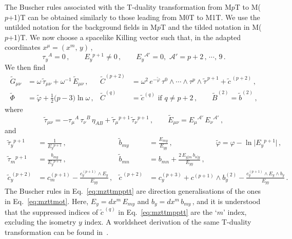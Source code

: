 \documentclass[11pt]{article}
\newcommand{\be}{\begin{equation}}
\newcommand{\ee}{\end{equation}}
\newcommand{\CA}{\mathcal{A}}
\renewcommand{\tilde}[1]{\widetilde{#1}}
\begin{document}
The Buscher rules associated with the T-duality transformation from M$p$T to M($p$+1)T can be obtained similarly to those leading from M0T to M1T. We use the untilded notation for the background fields in M$p$T and the tilded notation in M($p$+1)T. We now choose a spacelike Killing vector such that, in the adapted coordinates $x^\mu = (x^m, \, y)$\,, 
%
\be
\label{eq:gaugefixingMpTBuscher} 
    \tau^{}_y{}^A = 0\,,
        \qquad%
    E^{}_y{}^{p+1} \neq 0\,, 
        \qquad%
    E^{}_y{}^{\CA'}=0, \,\, \CA' = p+2\,, \, \cdots, \, 9\,.
\ee
%
We then find
%
\begin{subequations} \label{eq:rpgcfbmppot}
\begin{align}
    \tilde{G}_{\mu\nu} & = \omega \, \tilde{\tau}^{}_{\mu\nu} + \omega^{-1} \, \tilde{E}^{}_{\mu\nu}\,, 
        &
    \tilde{C}^{(p+2)} & = \omega^2 \, e^{-\tilde{\varphi}} \, \tau^0 \wedge \cdots \wedge \tau^p \wedge \tilde{\tau}^{\,p+1} + \tilde{c}^{\,(p+2)}\,, \\[4pt]
    \tilde{\Phi} & = \tilde{\varphi} + \tfrac{1}{2} \bigl( p - 3 \bigr) \ln \omega\,, 
        &
    \tilde{C}^{(q)} & = \tilde{c}^{(q)} \text{ if } q \neq p+2\,,
        \qquad%
    \tilde{B}^{(2)} = \tilde{b}^{(2)}\,,
\end{align}
\end{subequations}
%
where 
%
\be
    \tilde{\tau}_{\mu\nu} = - \tau_\mu{}^A \, \tau_\nu{}^B \, \eta^{}_{AB} + \tilde{\tau}_\mu{}^{p+1} \, \tilde{\tau}_\nu{}^{p+1}\,, 
        \qquad%
    \tilde{E}_{\mu\nu} = E_\mu{}^{\CA'} \, E_\nu{}^{\CA'}\,,
\ee
%
and
%
\begin{subequations} \label{eq:mzttmpptt}
\begin{align}
    \tilde{\tau}_{y}{}^{p+1} \! &= \frac{1}{E_{y}{}^{p+1}}\,, 
        &
    \tilde{b}_{my} & = \frac{E_{my}}{E_{yy}}\,,
        \qquad\qquad\qquad%
    \tilde{\varphi} = \varphi - \ln \bigl|E_{y}{}^{p+1}\bigr|\,,
     \\[4pt]
    \tilde{\tau}^{}_{m}{}^{p+1} \! & = \frac{b_{my}}{E_{y}{}^{p+1}}\,, 
        &
    \tilde{b}_{mn} & = b_{mn} + \frac{2 \, E_{y[m} \, b_{n]y}}{E_{yy}}\,,
        &
     \\[4pt]
    \tilde{c}^{\,(p+2)}_{y} \! & = c^{(p+1)}_m - \frac{c^{(p+1)}_y \! \wedge E_{y}}{E_{yy}}\,,
        &
    \tilde{c}^{\,(p+2)} \! & = c^{(p+3)}_{y} + c^{(p+1)} \! \wedge b^{(2)}_{y} - \frac{c^{(p+1)}_y \! \wedge E^{}_{y} \wedge b^{}_{y}}{E^{}_{yy}} \,.
\end{align}
\end{subequations}
%
The Buscher rules in Eq.~\eqref{eq:mzttmpptt} are direction generalisations of the ones in Eq.~\eqref{eq:mzttmot}. Here, $E_y = dx^m \, E_{my}$ and $b_y = dx^m \, b_{my}$\,, and it is understood that the suppressed indices of $\tilde{c}^{\,(q)}$ in Eq.~\eqref{eq:mzttmpptt} are the `$m$' index, excluding the isometry $y$ index. A worldsheet derivation of the same T-duality transformation can be found in~\cite{Gomis:2023eav}. 
\end{document}
